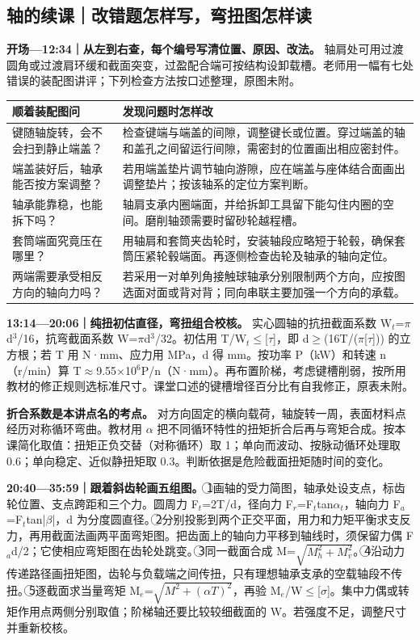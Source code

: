 \documentclass[zihao=5,a4paper,UTF8,fontset=fandol]{ctexart}
\begin{document}
\subsection{轴的续课｜改错题怎样写，弯扭图怎样读}

\textbf{开场—12:34｜从左到右查，每个编号写清位置、原因、改法。} 轴肩处可用过渡圆角或过渡肩环缓和截面突变，过盈配合端可按结构设卸载槽。老师用一幅有七处错误的装配图讲评；下列检查方法按口述整理，原图未附。


\begin{longtable}{p{7.51cm}p{7.51cm}}
\toprule
顺着装配图问 & 发现问题时怎样改 \\

\midrule
\endhead
键随轴旋转，会不会扫到静止端盖？ & 检查键端与端盖的间隙，调整键长或位置。穿过端盖的轴和盖孔之间留运行间隙，需密封的位置画出相应密封件。 \\
端盖装好后，轴承能否按方案调整？ & 若用端盖垫片调节轴向游隙，应在端盖与座体结合面画出调整垫片；按该轴系的定位方案判断。 \\
轴承能靠稳，也能拆下吗？ & 轴肩支承内圈端面，并给拆卸工具留下能勾住内圈的空间。磨削轴颈需要时留砂轮越程槽。 \\
套筒端面究竟压在哪里？ & 用轴肩和套筒夹齿轮时，安装轴段应略短于轮毂，确保套筒压紧轮毂端面。再逐侧检查齿轮及轴承的轴向定位。 \\
两端需要承受相反方向的轴向力吗？ & 若采用一对单列角接触球轴承分别限制两个方向，应按图选面对面或背对背；同向串联主要加强一个方向的承载。 \\
\bottomrule
\end{longtable}

\textbf{13:14—20:06｜纯扭初估直径，弯扭组合校核。} 实心圆轴的抗扭截面系数 W$_{t}$=$\pi$d$^{3}$/16，抗弯截面系数 W=$\pi$d$^{3}$/32。初估用 T/W$_{t}$$\le$[$\tau$]，即 d$\ge$(16T/($\pi$[$\tau$])) 的立方根；若 T 用 N·mm、应力用 MPa，d 得 mm。按功率 P（kW）和转速 n（r/min）算 T$\approx$9.55$\times$10$^{6}$P/n（N·mm）。再布置阶梯，考虑键槽削弱，按所用教材的修正规则选标准尺寸。课堂口述的键槽增径百分比有自我修正，原表未附。


\textbf{折合系数是本讲点名的考点。} 对方向固定的横向载荷，轴旋转一周，表面材料点经历对称循环弯曲。教材用 $\alpha$ 把不同循环特性的扭矩折合后再与弯矩合成。按本课简化取值：扭矩正负交替（对称循环）取 1；单向而波动、按脉动循环处理取 0.6；单向稳定、近似静扭矩取 0.3。判断依据是危险截面扭矩随时间的变化。


\textbf{20:40—35:59｜跟着斜齿轮画五组图。} \textcircled{1}画轴的受力简图，轴承处设支点，标齿轮位置、支点跨距和三个力。圆周力 F$_{t}$=2T/d，径向力 F$_{r}$=F$_{t}$tan$\alpha$$_{t}$，轴向力 F$_{a}$=F$_{t}$tan|$\beta$|，d 为分度圆直径。\textcircled{2}分别投影到两个正交平面，用力和力矩平衡求支反力，再用截面法画两平面弯矩图。把齿面上的轴向力平移到轴线时，须保留力偶 F$_{a}$d/2；它使相应弯矩图在齿轮处跳变。\textcircled{3}同一截面合成 M=$\sqrt{M_{h}^{2}+M_{v}^{2}}$。\textcircled{4}沿动力传递路径画扭矩图，齿轮与负载端之间传扭，只有理想轴承支承的空载轴段不传扭。\textcircled{5}逐截面求当量弯矩 M$_{e}$=$\sqrt{M^{2}+(\alpha T)^{2}}$，再验 M$_{e}$/W$\le$[$\sigma$]。集中力偶或转矩作用点两侧分别取值；阶梯轴还要比较较细截面的 W。若强度不足，调整尺寸并重新校核。
\end{document}
